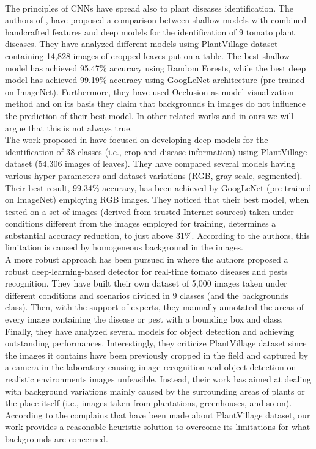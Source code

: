 \\\indent
The principles of CNNs have spread also to plant diseases identification. The authors of \cite{tunisia}, have proposed a comparison between shallow models with combined handcrafted features and deep models for the identification of 9 tomato plant diseases. They have analyzed different models using PlantVillage dataset containing 14,828 images of cropped leaves put on a table. The best shallow model has achieved 95.47\% accuracy using Random Forests, while the best deep model has achieved 99.19\% accuracy using GoogLeNet architecture (pre-trained on ImageNet). Furthermore, they have used Occlusion \cite{occlusion} as model visualization method and on its basis they claim that backgrounds in images do not influence the prediction of their best model. In other related works and in ours we will argue that this is not always true.
\\\indent
The work proposed in \cite{erba} have focused on developing deep models for the identification of 38 classes (i.e., crop and disease information) using PlantVillage dataset (54,306 images of leaves). They have compared several models having various hyper-parameters and dataset variations (RGB, gray-scale, segmented). Their best result, 99.34\% accuracy, has been achieved by GoogLeNet (pre-trained on ImageNet) employing RGB images. They noticed that their best model, when tested on a set of images (derived from trusted Internet sources) taken under conditions different from the images employed for training, determines a substantial accuracy reduction, to just above 31\%. According to the authors, this limitation is caused by homogeneous background in the images.
\\\indent
A more robust approach has been pursued in \cite{manzoni} where the authors proposed a robust deep-learning-based detector for real-time tomato diseases and pests recognition. They have built their own dataset of 5,000 images taken under different conditions and scenarios divided in 9 classes (and the backgrounds class). Then, with the support of experts, they manually annotated the areas of every image containing the disease or pest with a bounding box and class. Finally, they have analyzed several models for object detection and achieving outstanding performances. Interestingly, they criticize PlantVillage dataset since the images it contains have been previously cropped in the field and captured by a camera in the laboratory causing image recognition and object detection on realistic environments images unfeasible. Instead, their work has aimed at dealing with background variations mainly caused by the surrounding areas of plants or the place itself (i.e., images taken from plantations, greenhouses, and so on).
\\\indent
According to the complains that have been made about PlantVillage dataset, our work provides a reasonable heuristic solution to overcome its limitations for what backgrounds are concerned.
